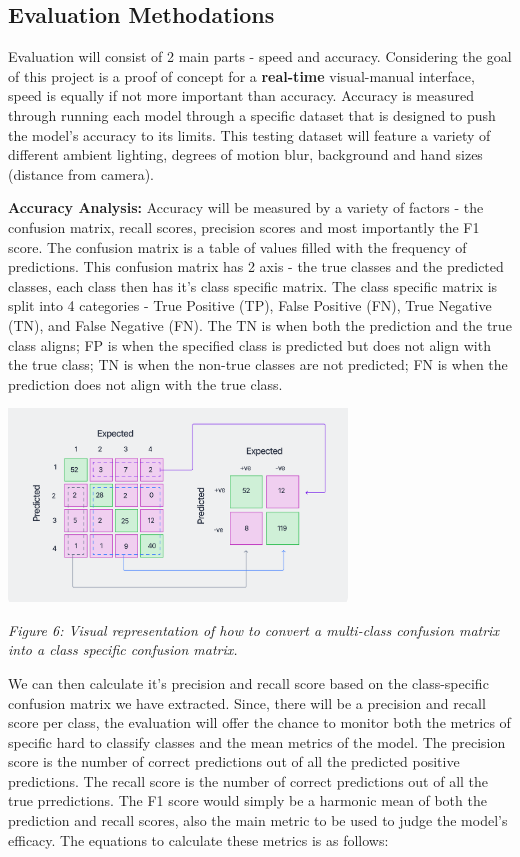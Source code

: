 \documentclass[11pt]{article}
\begin{document}
    \subsection{Evaluation Methodations}
        Evaluation will consist of 2 main parts - speed and accuracy. Considering the goal of this project is a proof of concept for a \textbf{real-time} visual-manual interface, speed is equally if not more important than accuracy. Accuracy is measured through running each model through a specific dataset that is designed to push the model's accuracy to its limits. This testing dataset will feature a variety of different ambient lighting, degrees of motion blur, background and hand sizes (distance from camera). 

        \noindent\textbf{Accuracy Analysis: } Accuracy will be measured by a variety of factors - the confusion matrix, recall scores, precision scores and most importantly the F1 score. The confusion matrix is a table of values filled with the frequency of predictions. This confusion matrix has 2 axis - the true classes and the predicted classes, each class then has it's class specific matrix. The class specific matrix is split into 4 categories - True Positive (TP), False Positive (FN), True Negative (TN), and False Negative (FN). The TN is when both the prediction and the true class aligns; FP is when the specified class is predicted but does not align with the true class; TN is when the non-true classes are not predicted; FN is when the prediction does not align with the true class.

        \begin{center}
            \includegraphics[width=9cm]{images/confusionclass.png}
            \\
            \raggedright \textit{
            Figure 6: Visual representation of how to convert a multi-class confusion matrix into a class specific confusion matrix.
            }
        \end{center}

        We can then calculate it's precision and recall score based on the class-specific confusion matrix we have extracted. Since, there will be a precision and recall score per class, the evaluation will offer the chance to monitor both the metrics of specific hard to classify classes and the mean metrics of the model. The precision score is the number of correct predictions out of all the predicted positive predictions. The recall score is the number of correct predictions out of all the true prredictions. The F1 score would simply be a harmonic mean of both the prediction and recall scores, also the main metric to be used to judge the model's efficacy. The equations to calculate these metrics is as follows:
\end{document}
